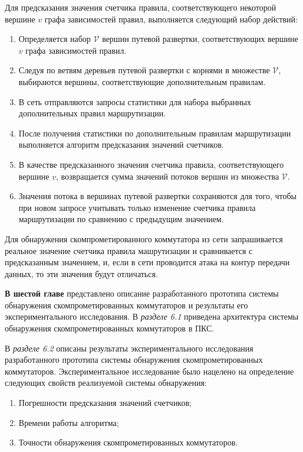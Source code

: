 \documentclass[14pt,autoref,href]{disser}
\theoremstyle{definition}
\begin{document}
Для предсказания значения счетчика правила, соответствующего некоторой вершине $v$ графа зависимостей правил, выполняется следующий набор действий:
\begin{enumerate}
\item Определяется набор $\mathcal{V}$ вершин путевой развертки, соответствующих вершине $v$ графа зависимостей правил.
\item Следуя по ветвям деревьев путевой развертки с корнями в множестве $\mathcal{V}$, выбираются вершины, соответствующие дополнительным правилам.
\item В сеть отправляются запросы статистики для набора выбранных дополнительных правил маршрутизации.
\item После получения статистики по дополнительным правилам маршрутизации выполняется алгоритм предсказания значений счетчиков.
\item В качестве предсказанного значения счетчика правила, соответствующего вершине $v$, возвращается сумма значений потоков вершин из множества $\mathcal{V}$.
\item Значения потока в вершинах путевой развертки сохраняются для того, чтобы при новом запросе учитывать только изменение счетчика правила маршрутизации по сравнению с предыдущим значением.
\end{enumerate}

Для обнаружения скомпрометированного коммутатора из сети запрашивается реальное значение счетчика правила машрутизации и сравнивается с предсказанным значением, и, если в сети проводится атака на контур передачи данных, то эти значения будут отличаться.

\textbf{В шестой главе} представлено описание разработанного прототипа системы обнаружения скомпрометированных коммутаторов и результаты его экспериментального исследования.
В \emph{разделе 6.1} приведена архитектура системы обнаружения скомпрометированных коммутаторов в ПКС.

В \emph{разделе 6.2} описаны результаты экспериментального исследования разработанного прототипа системы обнаружения скомпрометированных коммутаторов.
Экспериментальное исследование было нацелено на определение следующих свойств реализуемой системы обнаружения:
\begin{enumerate}
\item Погрешности предсказания значений счетчиков;
\item Времени работы алгоритма;
\item Точности обнаружения скомпрометированных коммутаторов.
\end{enumerate}
\end{document}
